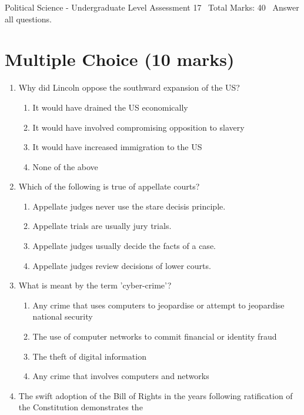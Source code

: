\documentclass[12pt]{article}
\begin{document}
\begin{center}
Political Science - Undergraduate Level Assessment 17 \
Total Marks: 40 \
Answer all questions.
\end{center}

\section*{Multiple Choice (10 marks)}
\begin{enumerate}[label=\arabic*.]
\item Why did Lincoln oppose the southward expansion of the US?
\begin{enumerate}[label=(\alph*)]
    \item It would have drained the US economically
    \item It would have involved compromising opposition to slavery
    \item It would have increased immigration to the US
    \item None of the above
\end{enumerate}
\item Which of the following is true of appellate courts?
\begin{enumerate}[label=(\alph*)]
    \item Appellate judges never use the stare decisis principle.
    \item Appellate trials are usually jury trials.
    \item Appellate judges usually decide the facts of a case.
    \item Appellate judges review decisions of lower courts.
\end{enumerate}
\item What is meant by the term 'cyber-crime'?
\begin{enumerate}[label=(\alph*)]
    \item Any crime that uses computers to jeopardise or attempt to jeopardise national security
    \item The use of computer networks to commit financial or identity fraud
    \item The theft of digital information
    \item Any crime that involves computers and networks
\end{enumerate}
\item The swift adoption of the Bill of Rights in the years following ratification of the Constitution demonstrates the
\begin{enumerate}[label=(\alph*)]

\end{enumerate}
\end{enumerate}
\end{document}

